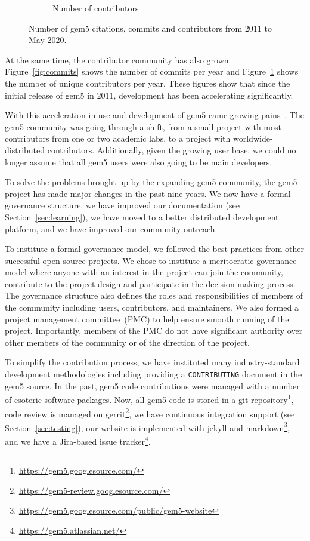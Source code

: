 \begin{figure}
\begin{subfigure}{0.28\linewidth}
      \caption{Number of contributors}
      \label{fig:contributors}
    \end{subfigure}
    \caption{Number of gem5 citations, commits and contributors from 2011 to May 2020.}
    \label{fig:gem5_citations_commits_contributors}
\end{figure}

At the same time, the contributor community has also grown.
Figure~\ref{fig:commits} shows the number of commits per year and Figure~\ref{fig:contributors} shows the number of unique contributors per year.
These figures show that since the initial release of gem5 in 2011, development has been accelerating significantly.

With this acceleration in use and development of gem5 came growing pains~\cite{Power-gem5horrors-2015}.
The gem5 community was going through a shift, from a small project with most contributors from one or two academic labs, to a project with worldwide-distributed contributors.
Additionally, given the growing user base, we could no longer assume that all gem5 users were also going to be main developers.

To solve the problems brought up by the expanding gem5 community, the gem5 project has made major changes in the past nine years.
We now have a formal governance structure, we have improved our documentation (see Section~\ref{sec:learning}), we have moved to a better distributed development platform, and we have improved our community outreach.

To institute a formal governance model, we followed the best practices from other successful open source projects.
We chose to institute a meritocratic governance model where anyone with an interest in the project can join the community, contribute to the project design and participate in the decision-making process.
The governance structure also defines the roles and responsibilities of members of the community including users, contributors, and maintainers.
We also formed a project management committee~(PMC) to help ensure smooth running of the project.
Importantly, members of the PMC do not have significant authority over other members of the community or of the direction of the project.

To simplify the contribution process, we have instituted many industry-standard development methodologies including providing a \verb|CONTRIBUTING| document in the gem5 source.
In the past, gem5 code contributions were managed with a number of esoteric software packages.
Now, all gem5 code is stored in a git repository\footnote{\url{https://gem5.googlesource.com/}}, code review is managed on gerrit\footnote{\url{https://gem5-review.googlesource.com/}}, we have continuous integration support (see Section~\ref{sec:testing}), our website is implemented with jekyll and markdown\footnote{\url{https://gem5.googlesource.com/public/gem5-website}}, and we have a Jira-based issue tracker\footnote{\url{https://gem5.atlassian.net/}}.

